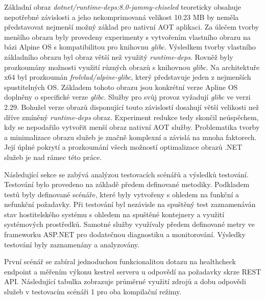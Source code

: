 Základní obraz \emph{dotnet/runtime-deps:8.0-jammy-chiseled} teoreticky obsahuje nepotřebné závislosti a jeho nekomprimovaná velikost 10.23 MB by neměla představovat nejmenší možný základ pro nativní AOT aplikaci. Za úlečem tvorby menšího obrazu byly provedeny experimenty s vytvořením vlastního obrazu na bázi Alpine OS s kompatibilitou pro knihovnu \emph{glibc}. Výsledkem tvorby vlastního základního obrazu byl obraz větší než využitý \emph{runtime-deps}. Rovněž byly prozkoumány možnosti využití různých obrazů s knihovnou \emph{glibc}. Na architektuře x64 byl prozkoumán \emph{frolvlad/alpine-glibc}, který představuje jeden z nejmenších spustitelných OS. Základem tohoto obrazu jsou konkrétní verze Apline OS doplněny o specifické verze \emph{glibc}. Služby pro svůj provoz vyžadují \emph{glibc} ve verzi 2.29. Bohužel verze obrazů disponující touto závislostí dosahují větší velikosti než dříve zmíněný \emph{runtime-deps} obraz. Experiment redukce tedy skončil neúspěchem, kdy se nepodařilo vytvořit menší obraz nativní AOT služby. Problematika tvorby a minimalizace obrazu služeb je značně komplexní a závislá na mnoha faktorech. Její úplné pokrytí a prozkoumání všech možností optimalizace obrazů .NET služeb je nad rámec této práce.


Následující sekce se zabývá analýzou testovacích scénářů a výsledků testování. Testování bylo provedeno na základě předem definované metodiky. Podkladem testů byly definované scénáře, které byly vytvořeny s ohledem na funkční a nefunkční požadavky. Při testování byl nezávisle na spuštěný test zaznamenáván stav hostitelského systému s ohledem na spuštěné kontejnery a využití systémových prostředků. Samotné služby využívaly předem definované metry ve frameworku ASP.NET pro dodatečnou diagnostiku a monitorování. Výsledky testování byly zaznamenány a analyzovány.


První scénář se zabíral jednoduchou funkcionalitou dotazu na healthcheck endpoint a měřením výkonu kestrel serveru u odpovědí na požadavky skrze REST API. Následující tabulka zobrazuje průměrné využití zdrojů a dobu odpovědi služeb v testovacím scénáři 1 pro oba kompilační režimy.

